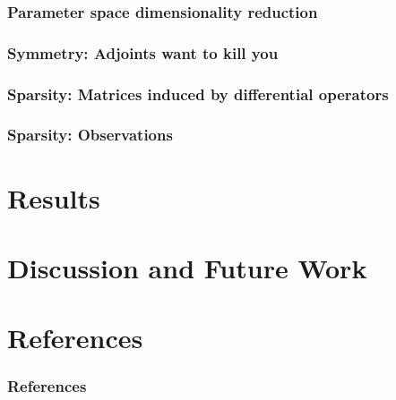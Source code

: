 \documentclass[
    pdf,
    10pt,
    xcolor={svgnames},
  ]{beamer}
\begin{document}
\begin{frame}
  \frametitle{Parameter space dimensionality reduction}
\end{frame}

\begin{frame}
  \frametitle{Symmetry: Adjoints want to kill you}
\end{frame}

\begin{frame}
  \frametitle{Sparsity: Matrices induced by differential operators}
\end{frame}

\begin{frame}
  \frametitle{Sparsity: Observations}
\end{frame}

\section{Results}

\section{Discussion and Future Work}


\section{References}
\begin{frame}[allowframebreaks]
  \frametitle{References}
  \printbibliography
\end{frame}
\end{document}
